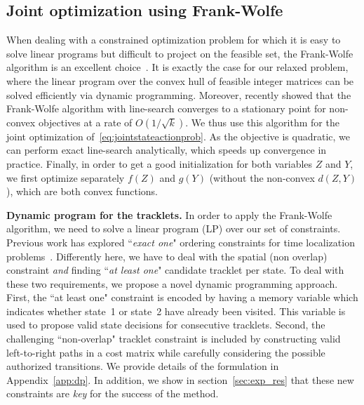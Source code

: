 \subsection{Joint optimization using Frank-Wolfe}
\label{subsec:frank-wolfe}
When dealing with a constrained optimization problem for which it is easy to solve linear programs but difficult to project on the feasible set, the Frank-Wolfe algorithm is an excellent choice~\cite{Jaggi2013,Lacoste15GlobalLinearFW}.
It is exactly the case for our relaxed problem, where the linear program over the convex hull of feasible integer matrices can be solved efficiently via dynamic
programming.
%
%
Moreover, \cite{lacoste16nonconvexFW} recently showed that the Frank-Wolfe algorithm with line-search converges to a stationary point for non-convex objectives at a rate of $O(1/\sqrt{k})$.
We thus use this algorithm for the joint optimization of~\eqref{eq:jointstateactionprob}. As the objective is quadratic, we can perform exact line-search analytically, which speeds up convergence in practice.
Finally, in order to get a good initialization for both variables $Z$ and $Y$, we first optimize separately $f(Z)$ and $g(Y)$ (without the non-convex $d(Z,Y)$), which are both convex functions.

\noindent\textbf{Dynamic program for the tracklets.}
In order to apply the Frank-Wolfe algorithm, we need to solve a linear program (LP) over our set of constraints. 
Previous work has explored ``\textit{exact one}" ordering constraints for time localization problems~\cite{Bojanowski14weakly}.
%
Differently here, we have to deal with the spatial (non overlap) constraint  \emph{and} finding ``\textit{at least one}" candidate tracklet per state.
To deal with these two requirements, we propose a novel dynamic programming approach.
First, the ``at least one" constraint is encoded by having a memory variable which indicates whether state~1 or state~2 have already been visited. This variable is used to propose valid state decisions for consecutive tracklets.
Second, the challenging ``non-overlap" tracklet constraint is included by constructing valid left-to-right paths in a cost matrix while carefully considering the possible authorized transitions.  
%
We provide details of the formulation in Appendix~\ref{app:dp}.
In addition, we show in section~\ref{sec:exp_res} that these new constraints are \emph{key} for the success of the method. %

%
%
%
%
%


%
%
%

%
%
%
%
%
%
%


